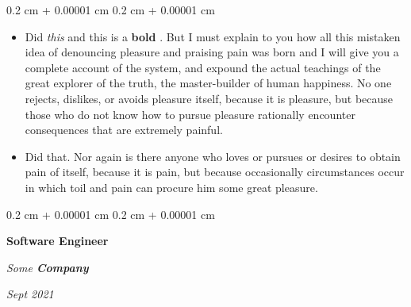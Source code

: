 \documentclass[10pt, letterpaper]{article}
\newenvironment{highlights}{
    \begin{itemize}[
        topsep=0.10 cm,
        parsep=0.10 cm,
        partopsep=0pt,
        itemsep=0pt,
        leftmargin=0.4 cm + 10pt
    ]
}{
    \end{itemize}
} %
\newenvironment{onecolentry}{
    \begin{adjustwidth}{
        0.2 cm + 0.00001 cm
    }{
        0.2 cm + 0.00001 cm
    }
}{
    \end{adjustwidth}
} %
\newenvironment{twocolentry}[2][]{
    \onecolentry
    \def\secondColumn{#2}
    \setcolumnwidth{\fill, 4.5 cm}
    \begin{paracol}{2}
}{
    \switchcolumn \raggedleft \secondColumn
    \end{paracol}
    \endonecolentry
} %
\let\hrefWithoutArrow\href
\renewcommand{\href}[2]{\hrefWithoutArrow{#1}{\ifthenelse{\equal{#2}{}}{ }{#2 }\raisebox{.15ex}{\footnotesize \faExternalLink*}}}
\begin{document}
        \vspace{0.10 cm}
        \begin{onecolentry}
            \begin{highlights}
                \item Did \textit{this} and this is a \textbf{bold} \href{https://example.com}{link}. But I must explain to you how all this mistaken idea of denouncing pleasure and praising pain was born and I will give you a complete account of the system, and expound the actual teachings of the great explorer of the truth, the master-builder of human happiness. No one rejects, dislikes, or avoids pleasure itself, because it is pleasure, but because those who do not know how to pursue pleasure rationally encounter consequences that are extremely painful.
                \item Did that. Nor again is there anyone who loves or pursues or desires to obtain pain of itself, because it is pain, but because occasionally circumstances occur in which toil and pain can procure him some great pleasure.
            \end{highlights}
        \end{onecolentry}


        \vspace{0.2 cm}

            \begin{twocolentry}{


        \textit{Sept 2021}    }
                \textbf{Software Engineer}

                \textit{Some \textbf{Company}}
            \end{twocolentry}
\end{document}
